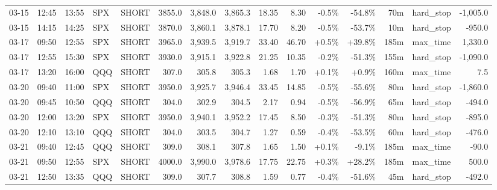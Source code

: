 \documentclass[11pt,a4paper,twoside]{article}
\begin{document}
\begin{landscape}
\begin{center}
\begin{longtable}{>{\color{txtmain}}l l l l l r r r r r r r r >{\color{txtmain}}l r}
03-15 & 12:45 & 13:55 & SPX & SHORT & 3855.0 & 3,848.0 & 3,865.3 & 18.35 & 8.30 & \textcolor{lossred}{-0.5\%} & \textcolor{lossred}{-54.8\%} & 70m & hard\_stop & \textcolor{lossred}{-1,005.0} \\
03-15 & 14:15 & 14:25 & SPX & SHORT & 3870.0 & 3,860.1 & 3,878.1 & 17.70 & 8.20 & \textcolor{lossred}{-0.5\%} & \textcolor{lossred}{-53.7\%} & 10m & hard\_stop & \textcolor{lossred}{-950.0} \\
03-17 & 09:50 & 12:55 & SPX & SHORT & 3965.0 & 3,939.5 & 3,919.7 & 33.40 & 46.70 & \textcolor{wingreen}{+0.5\%} & \textcolor{wingreen}{+39.8\%} & 185m & max\_time & \textcolor{wingreen}{1,330.0} \\
03-17 & 12:55 & 15:30 & SPX & SHORT & 3930.0 & 3,915.1 & 3,922.8 & 21.25 & 10.35 & \textcolor{lossred}{-0.2\%} & \textcolor{lossred}{-51.3\%} & 155m & hard\_stop & \textcolor{lossred}{-1,090.0} \\
03-17 & 13:20 & 16:00 & QQQ & SHORT & 307.0 & 305.8 & 305.3 & 1.68 & 1.70 & \textcolor{wingreen}{+0.1\%} & \textcolor{wingreen}{+0.9\%} & 160m & max\_time & \textcolor{wingreen}{7.5} \\
03-20 & 09:40 & 11:00 & SPX & SHORT & 3950.0 & 3,925.7 & 3,946.4 & 33.45 & 14.85 & \textcolor{lossred}{-0.5\%} & \textcolor{lossred}{-55.6\%} & 80m & hard\_stop & \textcolor{lossred}{-1,860.0} \\
03-20 & 09:45 & 10:50 & QQQ & SHORT & 304.0 & 302.9 & 304.5 & 2.17 & 0.94 & \textcolor{lossred}{-0.5\%} & \textcolor{lossred}{-56.9\%} & 65m & hard\_stop & \textcolor{lossred}{-494.0} \\
03-20 & 12:00 & 13:20 & SPX & SHORT & 3950.0 & 3,940.1 & 3,952.2 & 17.45 & 8.50 & \textcolor{lossred}{-0.3\%} & \textcolor{lossred}{-51.3\%} & 80m & hard\_stop & \textcolor{lossred}{-895.0} \\
03-20 & 12:10 & 13:10 & QQQ & SHORT & 304.0 & 303.5 & 304.7 & 1.27 & 0.59 & \textcolor{lossred}{-0.4\%} & \textcolor{lossred}{-53.5\%} & 60m & hard\_stop & \textcolor{lossred}{-476.0} \\
03-21 & 09:40 & 12:45 & QQQ & SHORT & 309.0 & 308.1 & 307.8 & 1.65 & 1.50 & \textcolor{wingreen}{+0.1\%} & \textcolor{lossred}{-9.1\%} & 185m & max\_time & \textcolor{lossred}{-90.0} \\
03-21 & 09:50 & 12:55 & SPX & SHORT & 4000.0 & 3,990.0 & 3,978.6 & 17.75 & 22.75 & \textcolor{wingreen}{+0.3\%} & \textcolor{wingreen}{+28.2\%} & 185m & max\_time & \textcolor{wingreen}{500.0} \\
03-21 & 12:50 & 13:35 & QQQ & SHORT & 309.0 & 307.7 & 308.8 & 1.59 & 0.77 & \textcolor{lossred}{-0.4\%} & \textcolor{lossred}{-51.6\%} & 45m & hard\_stop & \textcolor{lossred}{-492.0} \\

\end{longtable}
\end{center}
\end{landscape}
\end{document}
